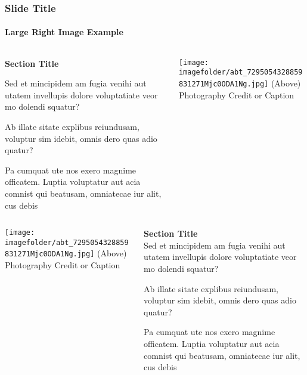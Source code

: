 \documentclass[
	aspectratio=169, %
	t, %
	onlytextwidth, %
	10pt, %
]{beamer}
\def\imagefolder{../ImperialTheme/Images/}
\begin{document}
\begin{frame}
	\frametitle{Slide Title}
	\framesubtitle{Large Right Image Example}
	
	\begin{columns}[T] %
		\begin{column}{0.48\linewidth} %
			\textbf{Section Title}
		
			Sed et mincipidem am fugia venihi aut utatem invellupis dolore voluptatiate veor mo dolendi squatur?

			Ab illate sitate explibus reiundusam, voluptur sim idebit, omnis dero quas adio quatur?

			Pa cumquat ute nos exero magnime officatem. Luptia voluptatur aut acia comnist qui beatusam, omniatecae iur alit, cus debis
		\end{column}
		\begin{column}{0.48\linewidth} %
			\vspace{-3.5\baselineskip} %
			
			\texttt{[image: \\imagefolder/abt\_7295054328859831271Mjc0ODA1Ng.jpg]} %
			{\tiny\textcolor{ICLBlue}{(Above) Photography Credit or Caption}}
		\end{column}
	\end{columns}
\end{frame}


\begin{frame}
	\begin{columns}[T] %
		\begin{column}{0.48\linewidth} %
			\texttt{[image: \\imagefolder/abt\_7295054328859831271Mjc0ODA1Ng.jpg]} %
			{\tiny\textcolor{ICLBlue}{(Above) Photography Credit or Caption}}
		\end{column}
		\begin{column}{0.48\linewidth} %
			\textbf{Section Title}\\
			Sed et mincipidem am fugia venihi aut utatem invellupis dolore voluptatiate veor mo dolendi squatur?

			Ab illate sitate explibus reiundusam, voluptur sim idebit, omnis dero quas adio quatur?

			Pa cumquat ute nos exero magnime officatem. Luptia voluptatur aut acia comnist qui beatusam, omniatecae iur alit, cus debis
		\end{column}
	\end{columns}
\end{frame}
\end{document}
